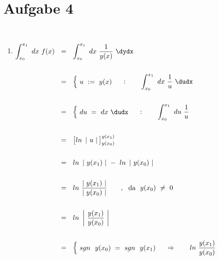 

\newpage



\section*{Aufgabe 4}

~\\

\begin{enumerate}[leftmargin=*, labelsep=2em, itemsep=3em, label=\alph*)]



	\item $\begin{aligned}[t]
	\int_{x_0}^{x_1} ~ dx ~ f(x) ~~ &= ~~ \int_{x_0}^{x_1} ~ dx ~ \frac{1}{y(x)} ~ \dydx \\ \\
	&= ~~ {\begin{cases}
		~ u ~ := ~ y(x) ~
	\end{cases}} : \qquad \int_{x_0}^{x_1} ~ dx ~ \frac{1}{u} ~ \dudx \\ \\
	&= ~~ {\begin{cases}
		~ du ~ = ~  dx ~ \dudx ~
	\end{cases}} : \qquad \int_{x_0}^{x_1} ~ du ~ \frac{1}{u} \\ \\
	&= ~~ {\big[ ln ~ \left| ~ u ~ \right| \big]}_{y(x_0)}^{y(x_1)} \\ \\
	&= ~~ ln ~ \left| ~ y(x_1) ~ \right| ~ - ~ ln ~ \left| ~ y(x_0) ~ \right| \\ \\
	&= ~~ ln ~ \frac{ \left| ~ y(x_1) ~ \right| }{ \left| ~ y(x_0) ~ \right| } \qquad, ~~ \text{da ~} y(x_0) ~ \neq ~ 0 \\ \\
	&= ~~ ln ~ \left| ~ \frac{ y(x_1) }{ y(x_0) } ~ \right| \\ \\
	&= ~~ \begin{cases}
		~ sgn ~~ y(x_0) ~ = ~ sgn ~~ y(x_1) ~
	\end{cases} \Rightarrow \qquad ln ~ \frac{ y(x_1) }{ y(x_0) }  \\ \\
	\end{aligned}$
	

\end{enumerate}

